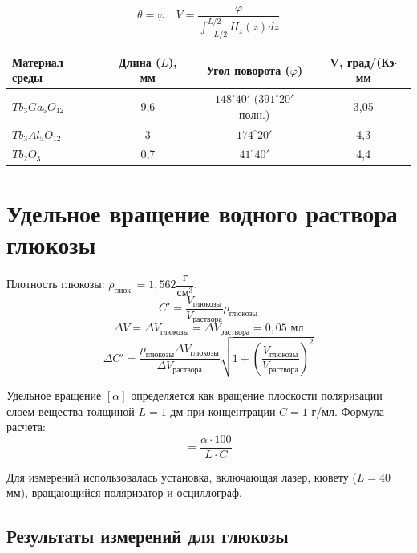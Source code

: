 \documentclass[a4paper,12pt]{article}
\begin{document}
$$
    \theta = \varphi \hspace{1em} V = \dfrac{\varphi}{\int_{-L/2}^{L/2} H_z(z)dz}
$$

\begin{table}[h!]
\centering
\begin{tabular}{lccc}
\toprule
Материал среды & Длина ($L$), мм & Угол поворота ($\varphi$) & V, град/(Кэ$\cdot$мм\\
\midrule
$Tb_3Ga_5O_{12}$ & 9,6 & $148^{\circ} 40'$ ($391^{\circ} 20'$ полн.) & 3,05 \\
$Tb_3Al_5O_{12}$ & 3 & $174^{\circ} 20'$ & 4,3 \\
$Tb_2O_3$        & 0,7 & $41^{\circ} 40'$ & 4,4 \\
\bottomrule
\end{tabular}
\end{table}

\section{Удельное вращение водного раствора глюкозы}

Плотность глюкозы: $\rho_\text{глюк.} = 1,562 \dfrac{\text{г}}{\text{см}^3}$.
$$
    C' = \dfrac{V_\text{глюкозы}}{V_\text{раствора}}\rho_\text{глюкозы}
$$
$$
    \Delta V = \Delta V_\text{глюкозы} = \Delta V_\text{раствора} = 0,05 \text{ мл}
$$
$$
    \Delta C' = \dfrac{\rho_\text{глюкозы}\Delta V_\text{глюкозы}}{\Delta V_\text{раствора}} \sqrt{1 + \left(\dfrac{V_\text{глюкозы}}{V_\text{раствора}}\right)^2}
$$

Удельное вращение $[\alpha]$ определяется как вращение плоскости поляризации слоем вещества толщиной $L=1$ дм при концентрации $C = 1$ г/мл. Формула расчета:
\begin{equation}
[\alpha] = \frac{\alpha \cdot 100}{L \cdot C}
\end{equation}

Для измерений использовалась установка, включающая лазер, кювету ($L=40$ мм), вращающийся поляризатор и осциллограф.

\subsection*{Результаты измерений для глюкозы}
\end{document}
